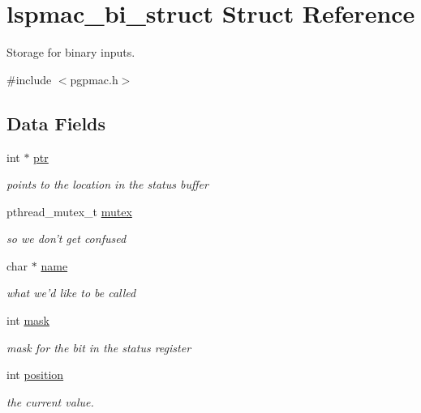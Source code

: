 \hypertarget{structlspmac__bi__struct}{\section{lspmac\-\_\-bi\-\_\-struct Struct Reference}
\label{structlspmac__bi__struct}
}


Storage for binary inputs.  




{\ttfamily \#include $<$pgpmac.\-h$>$}

\subsection*{Data Fields}
\begin{DoxyCompactItemize}
\item 
int $\ast$ \hyperlink{structlspmac__bi__struct_ae201bf05130bcb6985704ea42efabeb3}{ptr}
\begin{DoxyCompactList}\small\item\em points to the location in the status buffer \end{DoxyCompactList}\item 
pthread\-\_\-mutex\-\_\-t \hyperlink{structlspmac__bi__struct_a58053a98fa4696b56d674e775b3b4690}{mutex}
\begin{DoxyCompactList}\small\item\em so we don't get confused \end{DoxyCompactList}\item 
char $\ast$ \hyperlink{structlspmac__bi__struct_a4e614425eaa9d1ff8ba225d264f6dcf6}{name}
\begin{DoxyCompactList}\small\item\em what we'd like to be called \end{DoxyCompactList}\item 
int \hyperlink{structlspmac__bi__struct_ac010058c9883088705059dee1d90ee72}{mask}
\begin{DoxyCompactList}\small\item\em mask for the bit in the status register \end{DoxyCompactList}\item 
int \hyperlink{structlspmac__bi__struct_a76c4627028b86141c101f1764bebb7b0}{position}
\begin{DoxyCompactList}\small\item\em the current value. \end{DoxyCompactList}\item 

\end{DoxyCompactItemize}
